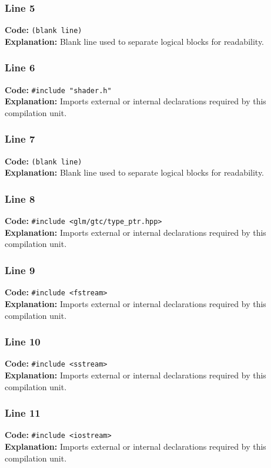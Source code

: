 \documentclass[11pt,a4paper]{article}
\begin{document}
\subsubsection*{Line 5}
\textbf{Code:} \texttt{(blank line)}\\
\textbf{Explanation:} Blank line used to separate logical blocks for readability.

\subsubsection*{Line 6}
\textbf{Code:} \verb|#include "shader.h"|\\
\textbf{Explanation:} Imports external or internal declarations required by this compilation unit.

\subsubsection*{Line 7}
\textbf{Code:} \texttt{(blank line)}\\
\textbf{Explanation:} Blank line used to separate logical blocks for readability.

\subsubsection*{Line 8}
\textbf{Code:} \verb|#include <glm/gtc/type_ptr.hpp>|\\
\textbf{Explanation:} Imports external or internal declarations required by this compilation unit.

\subsubsection*{Line 9}
\textbf{Code:} \verb|#include <fstream>|\\
\textbf{Explanation:} Imports external or internal declarations required by this compilation unit.

\subsubsection*{Line 10}
\textbf{Code:} \verb|#include <sstream>|\\
\textbf{Explanation:} Imports external or internal declarations required by this compilation unit.

\subsubsection*{Line 11}
\textbf{Code:} \verb|#include <iostream>|\\
\textbf{Explanation:} Imports external or internal declarations required by this compilation unit.
\end{document}
